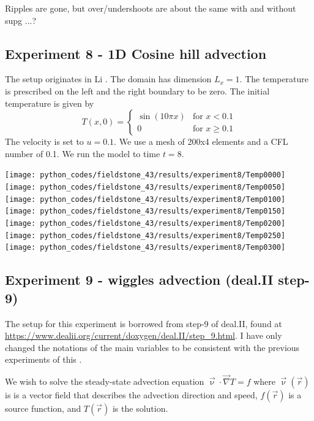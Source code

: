 Ripples are gone, but over/undershoots are about the same with and without supg ...?


\subsection*{Experiment 8 - 1D Cosine hill advection}

The setup originates in Li \cite[ex 5.2]{li06}.
The domain has dimension $L_x=1$. 
The temperature is prescribed on the left and the right boundary to be zero. 
The initial temperature is given by
\[
T(x,0)=
\left\{
\begin{array}{ll}
\sin (10 \pi x) & \textrm{for } x< 0.1 \\
0               & \textrm{for } x\geq 0.1 
\end{array}
\right.
\]
The velocity is set to $u=0.1$.
We use a mesh of 200x4 elements and a CFL number of 0.1. 
We run the model to time $t=8$.


\begin{center}
\texttt{[image: python\_codes/fieldstone\_43/results/experiment8/Temp0000]}
\texttt{[image: python\_codes/fieldstone\_43/results/experiment8/Temp0050]}
\texttt{[image: python\_codes/fieldstone\_43/results/experiment8/Temp0100]}
\texttt{[image: python\_codes/fieldstone\_43/results/experiment8/Temp0150]}\\
\texttt{[image: python\_codes/fieldstone\_43/results/experiment8/Temp0200]}
\texttt{[image: python\_codes/fieldstone\_43/results/experiment8/Temp0250]}
\texttt{[image: python\_codes/fieldstone\_43/results/experiment8/Temp0300]}
\end{center}


\newpage
\subsection*{Experiment 9 - wiggles advection (deal.II step-9)}

The setup for this experiment is borrowed from step-9 of deal.II, found at 
\url{https://www.dealii.org/current/doxygen/deal.II/step_9.html}.
I have only changed the notations of the main variables to be consistent 
with the previous experiments of this \stone.

We wish to solve the steady-state advection equation 
$\vec\upnu \cdot \vec\nabla T = f$ 
where $\vec\upnu(\vec r)$ is  is a vector field that describes the advection direction and speed,
$f(\vec r)$ is a source function, and $T(\vec r)$ is the solution. 


